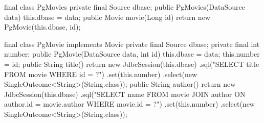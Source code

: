 \documentclass{article}
\begin{document}
\begin{pptWide}{2}
{\small\begin{ffcode}
final class PgMovies
  private final Source dbase;
  public PgMovies(DataSource data)
    this.dbase = data;
  public Movie movie(Long id)
    return new PgMovie(this.dbase, id);
\end{ffcode}
}
\par\columnbreak\par
{\scriptsize\begin{ffcode}
final class PgMovie implements Movie
  private final Source dbase;
  private final int number;
  public PgMovie(DataSource data, int id)
    this.dbase = data;
    this.number = id;
  public String title()
    return new JdbcSession(this.dbase)
      .sql("SELECT title FROM movie WHERE id = ?")
      .set(this.number)
      .select(new SingleOutcome<String>(String.class));
  public String author()
    return new JdbcSession(this.dbase)
      .sql("SELECT name FROM movie JOIN author ON author.id = movie.author WHERE movie.id = ?")
      .set(this.number)
      .select(new SingleOutcome<String>(String.class));
\end{ffcode}
}
\end{pptWide}
\par
\plush{}

\end{document}
